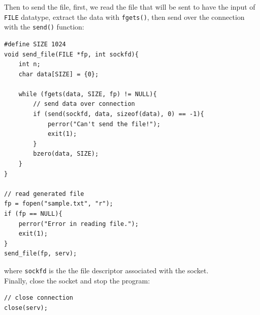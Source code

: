 \documentclass[times, 10pt]{thesisMDH}
\begin{document}
Then to send the file, first, we read the file that will be sent to have the input of \texttt{FILE} datatype, extract the data with \texttt{fgets()}, then send over the connection with the \texttt{send()} function:
\begin{lstlisting}
#define SIZE 1024
void send_file(FILE *fp, int sockfd){
    int n;
    char data[SIZE] = {0};

    while (fgets(data, SIZE, fp) != NULL){
        // send data over connection
    	if (send(sockfd, data, sizeof(data), 0) == -1){
			perror("Can't send the file!");
			exit(1);
		}
		bzero(data, SIZE);
    }
}

// read generated file
fp = fopen("sample.txt", "r");
if (fp == NULL){
	perror("Error in reading file.");
	exit(1);
}
send_file(fp, serv);
\end{lstlisting}
where \texttt{sockfd} is the the file descriptor associated with the socket.\\[0.5em]
Finally, close the socket and stop the program:
\begin{lstlisting}
// close connection
close(serv);
\end{lstlisting}
\end{document}
